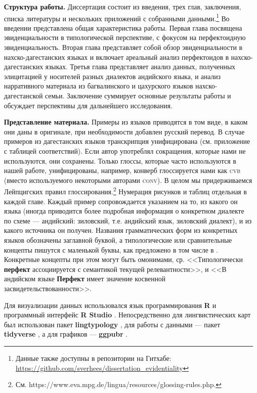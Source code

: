 \textbf{Структура работы.} Диссертация состоит из введения, трех глав, заключения, списка литературы и нескольких приложений с собранными данными.\footnote{Данные также доступны в репозитории на Гитхабе: \url{https://github.com/sverhees/dissertation_evidentiality}} Во введении представлена общая характеристика работы. Первая глава посвящена эвиденциальности в типологической перспективе, с фокусом на перфектоидную эвиденциальность. Вторая глава представляет собой обзор эвиденциальности в нахско-дагестанских языках и включает ареальный анализ перфектоидов в нахско-дагестанских языках. Третья глава представляет анализ данных, полученных элицитацией у носителей разных диалектов андийского языка, и анализ нарративного материала из багвалинского и цахурского языков нахско-дагестанской семьи. Заключение суммирует основные результаты работы и обсуждает перспективы для дальнейшего исследования.
\par \textbf{Представление материала.} Примеры из языков приводятся в том виде, в каком они даны в оригинале, при необходимости добавлен русский перевод. В случае примеров из дагестанских языков транскрипция унифицирована (см. приложение  с таблицей соответствий). Если автор употреблял сокращения, которые нами не используются, они сохранены. Только глоссы, которые часто используются в нашей работе, унифицированы, например, конверб глоссируется нами как \textsc{cvb} (вместо используемого некоторыми авторами \textsc{conv}). В целом мы придерживаемся Лейпцигских правил глоссирования.\footnote{См. https://www.eva.mpg.de/lingua/resources/glossing-rules.php.} Нумерация рисунков и таблиц отдельная в каждой главе. Каждый пример сопровождается указанием на то, из какого он языка (иногда приводится более подробная информация о конкретном диалекте по схеме --- андийский: зиловский, т.е. андийский язык, зиловский диалект), и из какого источника он получен. Названия грамматических форм из конкретных языков обозначены заглавной буквой, а типологические или сравнительные концепты пишутся с маленькой буквы, как предложено в том числе в \citep{haspelmath2010}. Конкретные концепты при этом могут быть омонимами, ср. <<Типологически \textbf{перфект} ассоциируется с семантикой текущей релевантности>>, и <<В андийском языке \textbf{Перфект} имеет значение косвенной засвидетельствованности>>.
\par Для визуализации данных использовался язык программирования \textbf{R} и программный интерфейс \textbf{R Studio} \citep{r}. Непосредственно для лингвистических карт был использован пакет \textbf{lingtypology} \citep{lingtypology}, для работы с данными --- пакет  \textbf{tidyverse} \citep{tidyverse}, а для графиков --- \textbf{ggpubr} \citep{ggpubr}.

